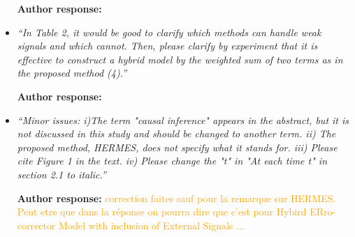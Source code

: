 \documentclass[10pt]{article} %
\begin{document}
\begin{itemize}
	\textbf{Author response:}\\	

	\item {\em ``In Table 2, it would be good to clarify which methods can handle weak signals and which cannot. Then, please clarify by experiment that it is effective to construct a hybrid model by the weighted sum of two terms as in the proposed method (4).''} \medskip

	\textbf{Author response:}\\	
	
	\item {\em ``Minor issues: i)The term "causal inference" appears in the abstract, but it is not discussed in this study and should be changed to another term. ii) The proposed method, HERMES, does not specify what it stands for. iii) Please cite Figure 1 in the text. iv) Please change the "t" in "At each time t" in section 2.1 to italic.''} \medskip

	\textbf{Author response:} \textcolor{orange}{correction faites sauf pour la remarque sur HERMES. Peut etre que dans la réponse on pourra dire que c'est pour Hybird ERro-corrector Model with inclusion of External Signals ...}\\	
\end{itemize}
\end{document}
